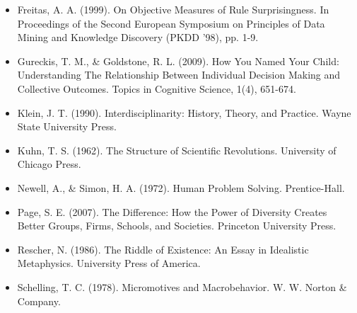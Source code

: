 \begin{itemize}

\item Freitas, A. A. (1999). On Objective Measures of Rule Surprisingness. In Proceedings of the Second European Symposium on Principles of Data Mining and Knowledge Discovery (PKDD '98), pp. 1-9.

\item Gureckis, T. M., \& Goldstone, R. L. (2009). How You Named Your Child: Understanding The Relationship Between Individual Decision Making and Collective Outcomes. Topics in Cognitive Science, 1(4), 651-674.

\item Klein, J. T. (1990). Interdisciplinarity: History, Theory, and Practice. Wayne State University Press.

\item Kuhn, T. S. (1962). The Structure of Scientific Revolutions. University of Chicago Press.

\item Newell, A., \& Simon, H. A. (1972). Human Problem Solving. Prentice-Hall.

\item Page, S. E. (2007). The Difference: How the Power of Diversity Creates Better Groups, Firms, Schools, and Societies. Princeton University Press.

\item Rescher, N. (1986). The Riddle of Existence: An Essay in Idealistic Metaphysics. University Press of America.

\item Schelling, T. C. (1978). Micromotives and Macrobehavior. W. W. Norton \& Company.

\end{itemize}
